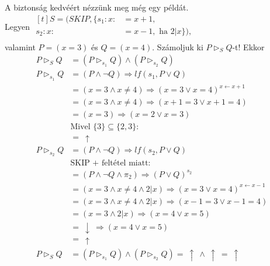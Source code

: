 \documentclass[12pt]{article}
\begin{document}
A biztonság kedvéért nézzünk meg még egy példát. \\
Legyen $\begin{aligned}[t]
	S = (SKIP, \{
		s_1: x :&= x+1, \\
		s_2: x :&= x-1, \text{ ha } 2|x \}), \\
\end{aligned}$ \\
valamint $P = (x=3)$ és $Q = (x=4)$. Számoljuk ki $P \vartriangleright_S Q$-t! Ekkor
\begin{align*}
	P \vartriangleright_S Q &= (P \vartriangleright_{s_1} Q) \land (P \vartriangleright_{s_2} Q) \\
	P \vartriangleright_{s_1} Q &= (P \land \neg Q) \Rightarrow lf(s_1, P \lor Q) \\
		&= (x = 3 \land x \neq 4) \Rightarrow (x=3 \lor x=4)^{x \leftarrow x+1} \\
		&= (x = 3 \land x \neq 4) \Rightarrow (x+1=3 \lor x+1=4) \\
		&= (x = 3) \Rightarrow (x=2 \lor x=3) \\
		&\text{Mivel } \{3\} \subseteq \{2, 3\}: \\
		&=\ \uparrow \\
	P \vartriangleright_{s_2} Q &= (P \land \neg Q) \Rightarrow lf(s_2, P \lor Q) \\
		&\text{SKIP + feltétel miatt:} \\
		&= (P \land \neg Q \land \pi_2) \Rightarrow (P \lor Q)^{s_2} \\
		&= (x=3 \land x \neq 4 \land 2|x) \Rightarrow (x=3 \lor x=4)^{x \leftarrow x-1} \\
		&= (x=3 \land x \neq 4 \land 2|x) \Rightarrow (x-1=3 \lor x-1=4) \\
		&= (x=3 \land 2|x) \Rightarrow (x=4 \lor x=5) \\
		&=\ \downarrow\ \Rightarrow (x=4 \lor x=5) \\
		&=\ \uparrow \\
	P \vartriangleright_S Q &= (P \vartriangleright_{s_1} Q) \land (P \vartriangleright_{s_2} Q) =\ \uparrow\ \land\ \uparrow\ =\ \uparrow
\end{align*}

\newpage
\end{document}
